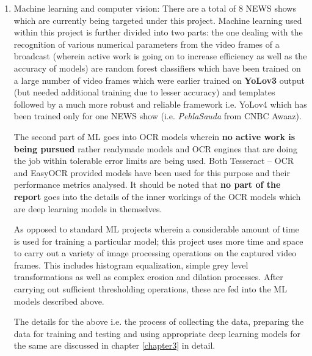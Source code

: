 \begin{enumerate}
  \item Machine learning and computer vision: There are a total of 8 NEWS shows which are currently being targeted under this project. Machine learning used within this project is further divided into two parts: the one dealing with the recognition of various numerical parameters from the video frames of a broadcast (wherein active work is going on to increase efficiency as well as the accuracy of models) are random forest classifiers which have been trained on a large number of video frames which were earlier trained on \textbf{YoLov3} output (but needed additional training due to lesser accuracy) and templates followed by a much more robust and reliable framework i.e. YoLov4 which has been trained only for one NEWS show (i.e. \textit{PehlaSauda} from CNBC Awaaz). \par

  The second part of ML goes into OCR models wherein \textbf{no active work is being pursued} rather readymade models and OCR engines that are doing the job within tolerable error limits are being used. Both Tesseract – OCR and EasyOCR provided models have been used for this purpose and their performance metrics analysed. It should be noted that \textbf{no part of the report} goes into the details of the inner workings of the OCR models which are deep learning models in themselves. \par

  As opposed to standard ML projects wherein a considerable amount of time is used for training a particular model; this project uses more time and space to carry out a variety of image processing operations on the captured video frames. This includes histogram equalization, simple grey level transformations as well as complex erosion and dilation processes. After carrying out sufficient thresholding operations, these are fed into the ML models described above.

  The details for the above i.e. the process of collecting the data, preparing the data for training and testing and using appropriate deep learning models for the same are discussed in chapter \ref{chapter3} in detail.


\end{enumerate}
